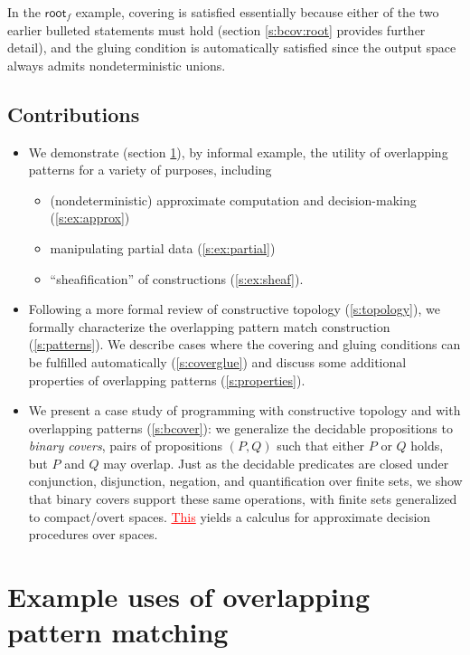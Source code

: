 \documentclass[conference]{IEEEtran}
\newcommand{\grammar}[1]{\textcolor{red}{\underline{#1}}}
\begin{document}
In the $\mathsf{root}_f$ example, covering is satisfied essentially because either of the two earlier bulleted statements must hold (section \ref{s:bcov:root} provides further detail), and the gluing condition is automatically satisfied since the output space always admits nondeterministic unions.


\subsection{Contributions}
\begin{itemize}
\item
We demonstrate (section \ref{s:examples}), by informal example, the utility of overlapping patterns for a variety of purposes, including
\begin{itemize}
\item (nondeterministic) approximate computation and decision-making (\ref{s:ex:approx})
\item manipulating partial data (\ref{s:ex:partial})
\item ``sheafification'' of constructions (\ref{s:ex:sheaf}).
\end{itemize}

\item Following a more formal review of constructive topology (\ref{s:topology}), we formally characterize the overlapping pattern match construction (\ref{s:patterns}). We describe cases where the covering and gluing conditions can be fulfilled automatically (\ref{s:coverglue}) and discuss some additional properties of overlapping patterns (\ref{s:properties}).

\item We present a case study of programming with constructive topology and with overlapping patterns (\ref{s:bcover}): we generalize the decidable propositions to \emph{binary covers}, pairs of propositions $(P, Q)$ such that either $P$ or $Q$ holds, but $P$ and $Q$ may overlap. Just as the decidable predicates are closed under conjunction, disjunction, negation, and quantification over finite sets, we show that binary covers support these same operations, with finite sets generalized to compact/overt spaces. \grammar{This} yields a calculus for approximate decision procedures over spaces.

\end{itemize}

\section{Example uses of overlapping pattern matching}
\label{s:examples}
\end{document}
